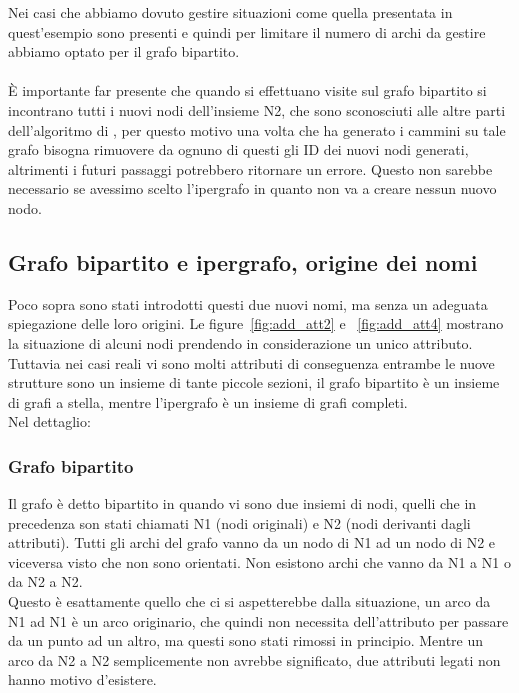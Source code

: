 Nei casi che abbiamo dovuto gestire situazioni come quella presentata in quest'esempio sono presenti e quindi per limitare il numero di archi da gestire abbiamo optato per il grafo bipartito.\\
\\
È importante far presente che quando si effettuano visite sul grafo bipartito si incontrano tutti i nuovi nodi dell'insieme N2, che sono sconosciuti alle altre parti dell'algoritmo di \cnrl, per questo motivo una volta che \nv ha generato i cammini su tale grafo bisogna rimuovere da ognuno di questi gli ID dei nuovi nodi generati, altrimenti i futuri passaggi potrebbero ritornare un errore. Questo non sarebbe necessario se avessimo scelto l'ipergrafo in quanto non va a creare nessun nuovo nodo.
%
\subsection{Grafo bipartito e ipergrafo, origine dei nomi}
Poco sopra sono stati introdotti questi due nuovi nomi, ma senza un adeguata spiegazione delle loro origini. Le figure~\ref{fig:add_att2} e ~\ref{fig:add_att4} mostrano la situazione di alcuni nodi prendendo in considerazione un unico attributo. Tuttavia nei casi reali vi sono molti attributi di conseguenza entrambe le nuove strutture sono un insieme di tante piccole sezioni, il grafo bipartito è un insieme di grafi a stella, mentre l'ipergrafo è un insieme di grafi completi.\\
Nel dettaglio:
%
\subsubsection*{Grafo bipartito}
Il grafo è detto bipartito in quando vi sono due insiemi di nodi, quelli che in precedenza son stati chiamati N1 (nodi originali) e N2 (nodi derivanti dagli attributi). Tutti gli archi del grafo vanno da un nodo di N1 ad un nodo di N2 e viceversa visto che non sono orientati. Non esistono archi che vanno da N1 a N1 o da N2 a N2.\\
Questo è esattamente quello che ci si aspetterebbe dalla situazione, un arco da N1 ad N1 è un arco originario, che quindi non necessita dell'attributo per passare da un punto ad un altro, ma questi sono stati rimossi in principio. Mentre un arco da N2 a N2 semplicemente non avrebbe significato, due attributi legati non hanno motivo d'esistere.
%
